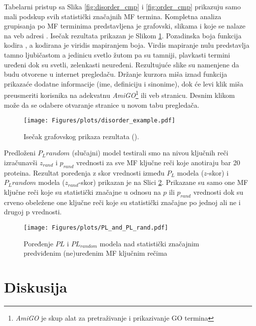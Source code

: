 Tabelarni pristup sa Slika \ref{fig:disorder_cmp} i \ref{fig:order_cmp}
prikazuju samo mali podskup svih statistički značajnih MF termina.  Kompletna
analiza grupisanja po MF terminima predstavljena je grafovski, slikama
 i  koje se nalaze na veb adresi
\cite{rezultati}.  Isečak rezultata  prikazan
je Slikom \ref{fig:disorder_example}.  Pozadinska boja funkcija kodira
, a kodirana je viridis \cite{viridis} mapiranjem
boja. Virdis mapiranje nulu predstavlja tamno ljubičastom a jedinicu svetlo
žutom pa su tamniji, plavkasti termini  uređeni dok su svetli, zelenkasti
neuređeni.  Rezultujuće  slike su namenjene da budu otvorene u
internet pregledaču.  Držanje kurzora miša iznad funkcija prikazaće dodatne
informacije (ime, definiciju i sinonime), dok će levi klik miša preusmeriti
korisnika na adekvatnu \textit{AmiGO}\footnote{\textit{AmiGO} je skup alat za
pretraživanje i prikazivanje GO termina } ili \uniprot veb stranicu. Desnim
klikom može da se odabere otvaranje stranice u novom tabu pregledača.

\begin{figure}[th]
\hspace*{-2.0cm} 
\texttt{[image: Figures/plots/disorder\_example.pdf]}
\caption {
  Isečak grafovskog prikaza rezultata ().
}
\label{fig:disorder_example}
\end{figure}


Predloženi $P_L random$ (slučajni) model testirali smo na nivou ključnih reči
izračunavši $z_{rand}$ i  $p_{rand}$ vrednosti za sve MF ključne reči koje
anotiraju bar 20 proteina. Rezultat poređenja z skor vrednosti između $P_L$
modela ($z$-skor) i $P_L random$ modela ($z_{rand}$-skor) prikazan je na Slici
\ref{fig:PLrand}. Prikazane su samo one MF ključne reči koje su statistički
značajne u odnosu na $p$ ili $p_{rand}$ vrednosti dok su crveno obeležene one
ključne reči koje su statistički značajne po jednoj ali ne i drugoj p
vrednosti.


\begin{figure}[th]
\hspace*{-3.0cm} 
\texttt{[image: Figures/plots/PL\_and\_PL\_rand.pdf]}
\caption {
  Poređenje $PL$ i $PL_{random}$ modela nad statistički značajnim predviđenim (ne)uređenim MF ključnim rečima
}
\label{fig:PLrand}
\end{figure}




\chapter{Diskusija} %

